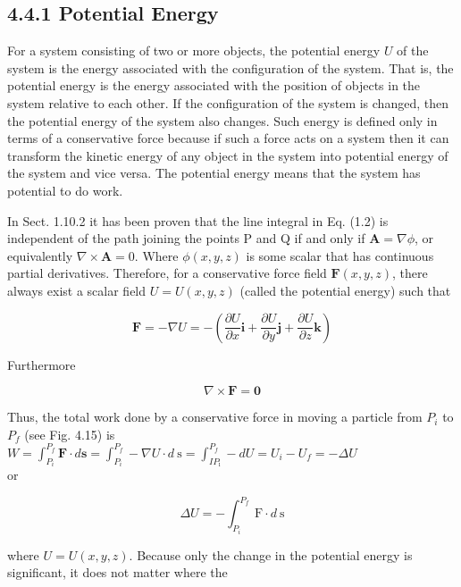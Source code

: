 \documentclass[10pt]{article}
\begin{document}
\subsection*{4.4.1 Potential Energy}
For a system consisting of two or more objects, the potential energy $U$ of the system is the energy associated with the configuration of the system. That is, the potential energy is the energy associated with the position of objects in the system relative to each other. If the configuration of the system is changed, then the potential energy of the system also changes. Such energy is defined only in terms of a conservative force because if such a force acts on a system then it can transform the kinetic energy of any object in the system into potential energy of the system and vice versa. The potential energy means that the system has potential to do work.

In Sect. 1.10.2 it has been proven that the line integral in Eq. (1.2) is independent of the path joining the points P and Q if and only if $\mathbf{A}=\nabla \phi$, or equivalently $\nabla \times \mathbf{A}=0$. Where $\phi(x, y, z)$ is some scalar that has continuous partial derivatives. Therefore, for a conservative force field $\mathbf{F}(x, y, z)$, there always exist a scalar field $U=U(x, y, z)$ (called the potential energy) such that

$$
\mathbf{F}=-\nabla U=-\left(\frac{\partial U}{\partial x} \mathbf{i}+\frac{\partial U}{\partial y} \mathbf{j}+\frac{\partial U}{\partial z} \mathbf{k}\right)
$$

Furthermore

$$
\nabla \times \mathbf{F}=\mathbf{0}
$$

Thus, the total work done by a conservative force in moving a particle from $P_{i}$ to $P_{f}$ (see Fig. 4.15) is\\
$W=\int_{P_{i}}^{P_{f}} \mathbf{F} \cdot d \mathbf{s}=\int_{P_{i}}^{P_{f}}-\nabla U \cdot d \mathrm{~s}=\int_{I P_{\mathrm{i}}}^{P_{f}}-d U=U_{i}-U_{f}=-\Delta U$\\
or

$$
\Delta U=-\int_{P_{i}}^{P_{f}} \mathrm{~F} \cdot d \mathrm{~s}
$$

where $U=U(x, y, z)$. Because only the change in the potential energy is significant, it does not matter where the
\end{document}
